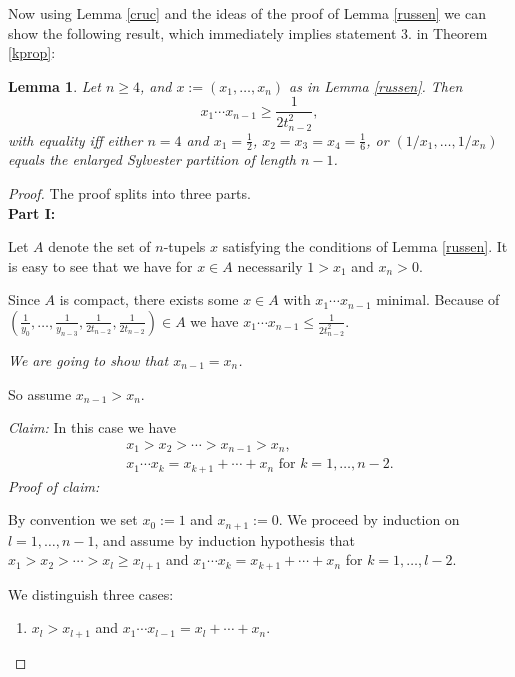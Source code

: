 \documentclass[a4paper,twoside]{article}
\newtheorem{lemma}[theorem]{Lemma}
\begin{document}
Now using Lemma \ref{cruc} and the ideas of the proof of Lemma \ref{russen} we can show the following result, which 
immediately implies statement 3. in Theorem \ref{kprop}:

\begin{lemma}
Let $n \geq 4$, and $x := (x_1, \ldots, x_n)$ as in Lemma \ref{russen}. Then
\[x_1 \cdots x_{n-1} \geq \frac{1}{2 t_{n-2}^2},\]
with equality iff {\em either} $n=4$ and $x_1 = \frac{1}{2}$, $x_2 = x_3 = x_4 = \frac{1}{6}$, {\em or} $(1/x_1, \ldots, 1/x_n)$ equals 
the enlarged Sylvester partition of length $n-1$.
\label{meins}
\end{lemma}

\begin{proof} 

The proof splits into three parts.\\

\textbf{Part I:} 

Let $A$ denote the set of $n$-tupels $x$ satisfying the conditions of Lemma \ref{russen}. 
It is easy to see that we have for $x \in A$ necessarily $1 > x_1$ and $x_n > 0$. 

Since $A$ is compact, there exists some $x \in A$ with $x_1 \cdots x_{n-1}$ minimal. Because of 
$(\frac{1}{y_0}, \ldots, \frac{1}{y_{n-3}}, \frac{1}{2 t_{n-2}}, \frac{1}{2 t_{n-2}}) \in A$ we have 
$x_1 \cdots x_{n-1} \leq \frac{1}{2 t_{n-2}^2}$.

\smallskip

{\em We are going to show that $x_{n-1} = x_n$.}

\smallskip

So assume $x_{n-1} > x_n$.

\smallskip

{\em Claim:} In this case we have
\begin{eqnarray*}
x_1 > x_2 > \cdots > x_{n-1} > x_n,\\
x_1 \cdots x_k = x_{k+1} + \cdots + x_n \text{ for } k = 1, \ldots, n-2.
\end{eqnarray*}
{\em Proof of claim:}

By convention we set $x_0 := 1$ and $x_{n+1} := 0$. We proceed by induction on $l = 1, \ldots, n-1$, and 
assume by induction hypothesis that $x_1 > x_2 > \cdots > x_l \geq x_{l+1}$ and 
$x_1 \cdots x_k = x_{k+1} + \cdots + x_n$ for $k = 1, \ldots, l-2$. 

We distinguish three cases:

\begin{enumerate}
\item $x_l > x_{l+1}$ and $x_1 \cdots x_{l-1} = x_l + \cdots + x_n$. 


\end{enumerate}
\end{proof}
\end{document}
